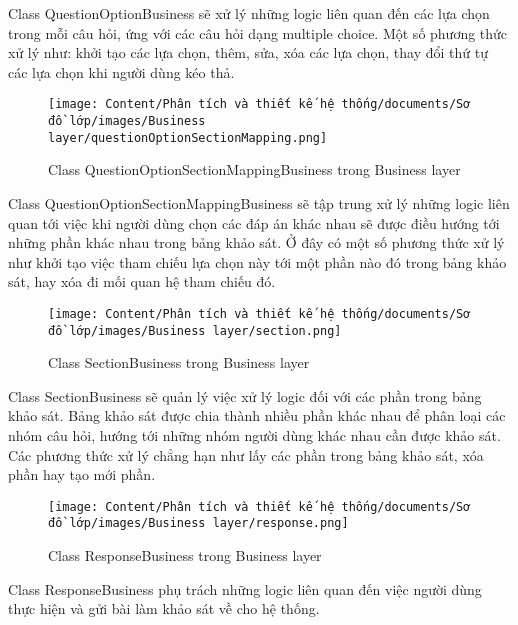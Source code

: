 \par
Class QuestionOptionBusiness sẽ xử lý những logic liên quan đến các lựa chọn trong mỗi câu hỏi, ứng với các câu hỏi dạng multiple choice. 
Một số phương thức xử lý như: khởi tạo các lựa chọn, thêm, sửa, xóa các lựa chọn, thay đổi thứ tự các lựa chọn khi người dùng kéo thả.
\begin{figure}[H]
    \centering
    \texttt{[image: Content/Phân tích và thiết kế hệ thống/documents/Sơ đồ lớp/images/Business layer/questionOptionSectionMapping.png]}
    \vspace{0.5cm}
    \caption{Class QuestionOptionSectionMappingBusiness trong Business layer}
    \label{fig:Class QuestionOptionSectionMappingBusiness trong Business layer}
\end{figure}
\par
Class QuestionOptionSectionMappingBusiness sẽ tập trung xử lý những logic liên quan tới việc khi người dùng chọn các đáp án khác nhau sẽ được 
điều hướng tới những phần khác nhau trong bảng khảo sát. Ở đây có một số phương thức xử lý như khởi tạo việc tham chiếu lựa chọn này tới một phần nào đó 
trong bảng khảo sát, hay xóa đi mối quan hệ tham chiếu đó.
\begin{figure}[H]
    \centering
    \texttt{[image: Content/Phân tích và thiết kế hệ thống/documents/Sơ đồ lớp/images/Business layer/section.png]}
    \vspace{0.5cm}
    \caption{Class SectionBusiness trong Business layer}
    \label{fig:Class SectionBusiness trong Business layer}
\end{figure}
\par
Class SectionBusiness sẽ quản lý việc xử lý logic đối với các phần trong bảng khảo sát. Bảng khảo sát được chia thành nhiều phần khác nhau để phân loại 
các nhóm câu hỏi, hướng tới những nhóm người dùng khác nhau cần được khảo sát. Các phương thức xử lý chẳng hạn như lấy các phần trong bảng khảo sát, xóa phần hay tạo mới phần.
\begin{figure}[H]
    \centering
    \texttt{[image: Content/Phân tích và thiết kế hệ thống/documents/Sơ đồ lớp/images/Business layer/response.png]}
    \vspace{0.5cm}
    \caption{Class ResponseBusiness trong Business layer}
    \label{fig:Class ResponseBusiness trong Business layer}
\end{figure}
\par
Class ResponseBusiness phụ trách những logic liên quan đến việc người dùng thực hiện và gửi bài làm khảo sát về cho hệ thống. 
